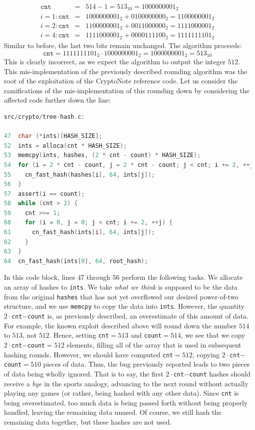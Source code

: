 \documentclass{mrl}
\begin{document}
\begin{eqnarray*}
\texttt{cnt}&=&514-1=513_{10}=1000000001_2 \\
i=1:\texttt{cnt}&=&1000000001_{2}+0100000000_{2}=1100000001_{2} \\
i=2:\texttt{cnt}&=&1100000001_{2}+0011000000_{2}=1111000001_{2} \\
i=4:\texttt{cnt}&=&1111000001_{2}+0000111100_{2}=1111111101_{2}
\end{eqnarray*}
Similar to before, the last two bits remain unchanged. The algorithm proceeds:
$$\texttt{cnt} =1111111101_{2} \cdot 1000000001_{2}=1000000001_{2}=513_{10}$$
This is clearly incorrect, as we expect the algorithm to output the integer $512$.  This mis-implementation of the previously described rounding algorithm was the root of the exploitation of the CryptoNote reference code. Let us consider the ramifications of the mis-implementation of this rounding down by considering the affected code further down the line:

\begin{lstlisting}[language=C]
src/crypto/tree-hash.c:

47  char (*ints)[HASH_SIZE];
52  ints = alloca(cnt * HASH_SIZE);
53  memcpy(ints, hashes, (2 * cnt - count) * HASH_SIZE);
54  for (i = 2 * cnt - count, j = 2 * cnt - count; j < cnt; i += 2, ++j) {
55    cn_fast_hash(hashes[i], 64, ints[j]);
56  }
57  assert(i == count);
58  while (cnt > 2) {
59    cnt >>= 1;
60    for (i = 0, j = 0; j < cnt; i += 2, ++j) {
61      cn_fast_hash(ints[i], 64, ints[j]);
62    }
63  }
64  cn_fast_hash(ints[0], 64, root_hash);

\end{lstlisting}

In this code block, lines $47$ through $56$ perform the following tasks. We allocate an array of hashes to \texttt{ints}. We take \emph{what we think} is supposed to be the data from the original \texttt{hashes} that has not yet overflowed our desired power-of-two structure, and we use \texttt{memcpy} to copy the data into \texttt{ints}. However, the quantity \texttt{$2\cdot$cnt$-$count} is, as previously described, an overestimate of this amount of data. For example, the known exploit described above will round down the number $514$ to $513$, not $512$. Hence, setting \texttt{cnt$=513$} and \texttt{count$=514$}, we see that we copy \texttt{$2\cdot$cnt$-$count$=512$} elements, filling all of the array that is used in subsequent hashing rounds. However, we should have computed \texttt{cnt$=512$}, copying \texttt{$2\cdot$cnt$-$count$=510$} pieces of data. Thus, the bug previously reported leads to two pieces of data being wholly ignored. That is to say, the first \texttt{$2\cdot$cnt$-$count} hashes should receive a \emph{bye} in the sports analogy, advancing to the next round without actually playing any games (or rather, being hashed with any other data). Since \texttt{cnt} is being overestimated, too much data is being passed forth without being properly handled, leaving the remaining data unused. Of course, we still hash the remaining data together, but these hashes are not used.
\end{document}
